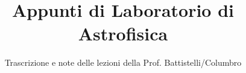 \documentclass[a4paper,12pt]{article}
\title{Appunti di Laboratorio di Astrofisica}
\author{Trascrizione e note delle lezioni della Prof. Battistelli/Columbro}
\date{}
\begin{document}
\maketitle
\projectintro
\tableofcontents
\newpage

\end{document}

